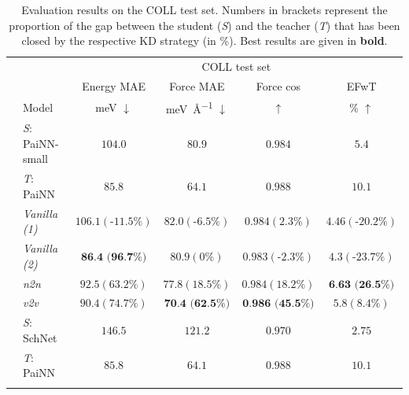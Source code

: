 \begin{table}[h]
\centering
\caption{Evaluation results on the COLL test set. Numbers in brackets represent the proportion of the gap between the student (\emph{S}) and the teacher (\emph{T}) that has been closed by the respective KD strategy (in \%). Best results are given in \textbf{bold}. }
\begin{tabular}{llcccc}
\cmidrule(r){1-6}
\multicolumn{1}{c}{\multirow{3}{*}{}} & &  \multicolumn{4}{c}{COLL test set} 
\\\cmidrule(r){3-6}
\multicolumn{1}{c}{}              &           &      Energy MAE  &    Force MAE  & Force cos & EFwT \\
&   \multicolumn{1}{l}{Model}             &      \si{\milli\electronvolt} $\downarrow$   &    \si{\milli\electronvolt\per\angstrom} $\downarrow$     & $\uparrow$  & \% $\uparrow$ \\
\cmidrule(r){1-6} \morecmidrules\cmidrule(r){1-6}
\parbox[t]{2mm}{} 
& \emph{S}: PaiNN-small                  &              $104.0$      &     $80.9$     &  $0.984$ &  $5.4$  \\
& \emph{T}: PaiNN                     &              $85.8$        &   $64.1$     &   $0.988$      &   $10.1$    \\
& \emph{Vanilla (1)}                 &            $106.1 (\text{-}11.5\%)$          &          $82.0 (\text{-}6.5\%)$     &     $0.984 (2.3\%)$        &  $4.46 (\text{-}20.2\%)$    \\
& \emph{Vanilla (2)}                &            $\textbf{86.4 (96.7\%)}$          &          $80.9 (0\%)$     &     $0.983 (\text{-}2.3\%)$        &  $4.3 (\text{-}23.7\%)$    \\
& \emph{n2n}                   &            $92.5 (63.2\%)$          &          $77.8 (18.5\%)$     &     $0.984 (18.2\%)$        &  $\textbf{6.63 (26.5\%)}$    \\
& \emph{v2v}                          &            $90.4 (74.7\%)$   &          $\textbf{70.4 (62.5\%)}$     &     $\textbf{0.986 (45.5\%)}$        &  $5.8 (8.4\%)$    \\
\cmidrule(r){1-6}
\parbox[t]{2mm}{} 
& \emph{S}: SchNet                    &              $146.5$        &   $121.2$     &   $0.970$      &   $2.75$    \\
& \emph{T}: PaiNN                     &            $85.8$        &   $64.1$     &   $0.988$      &   $10.1$    \\

\end{tabular}
\end{table}

